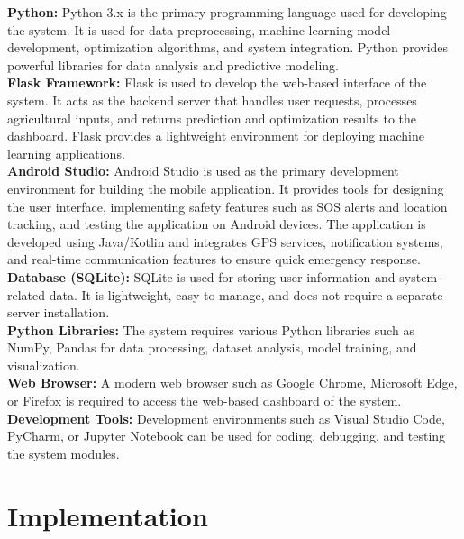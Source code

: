 \documentclass[a4paper,12pt]{report}
\begin{document}
\textbf{Python:} Python 3.x is the primary programming language used for developing the system. It is used for data preprocessing, machine learning model development, optimization algorithms, and system integration. Python provides powerful libraries for data analysis and predictive modeling.\\

\textbf{Flask Framework:} Flask is used to develop the web-based interface of the system. It acts as the backend server that handles user requests, processes agricultural inputs, and returns prediction and optimization results to the dashboard. Flask provides a lightweight environment for deploying machine learning applications.\\

\textbf{Android Studio:} Android Studio is used as the primary development environment for building the mobile application. It provides tools for designing the user interface, implementing safety features such as SOS alerts and location tracking, and testing the application on Android devices. The application is developed using Java/Kotlin and integrates GPS services, notification systems, and real-time communication features to ensure quick emergency response.\\

\textbf{Database (SQLite):} SQLite is used for storing user information and system-related data. It is lightweight, easy to manage, and does not require a separate server installation.\\

\textbf{Python Libraries:} The system requires various Python libraries such as NumPy, Pandas for data processing, dataset analysis, model training, and visualization.\\

\textbf{Web Browser:} A modern web browser such as Google Chrome, Microsoft Edge, or Firefox is required to access the web-based dashboard of the system.\\

\textbf{Development Tools:} Development environments such as Visual Studio Code, PyCharm, or Jupyter Notebook can be used for coding, debugging, and testing the system modules.\\

    
    
\chapter{Implementation}
\end{document}
